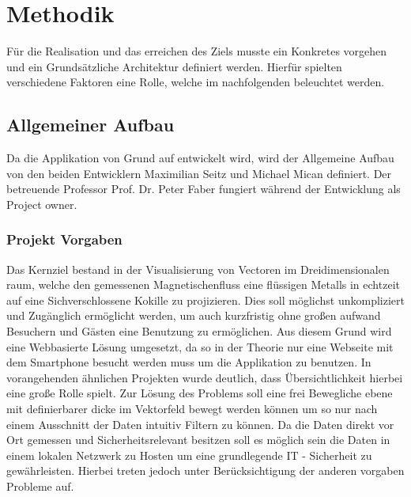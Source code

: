 \section{Methodik}
Für die Realisation und das erreichen des Ziels musste ein Konkretes vorgehen und ein Grundsätzliche Architektur definiert werden. Hierfür spielten verschiedene Faktoren eine Rolle, welche im nachfolgenden beleuchtet werden.

\subsection{Allgemeiner Aufbau}
Da die Applikation von Grund auf entwickelt wird, wird der Allgemeine Aufbau von den beiden Entwicklern Maximilian Seitz und Michael Mican definiert. Der betreuende Professor Prof. Dr. Peter Faber fungiert während der Entwicklung als Project owner.

\subsubsection{Projekt Vorgaben}
Das Kernziel bestand in der Visualisierung von Vectoren im Dreidimensionalen raum, welche den gemessenen Magnetischenfluss eine flüssigen Metalls in echtzeit auf eine Sichverschlossene Kokille zu projizieren. Dies soll möglichst unkompliziert und Zugänglich ermöglicht werden, um auch kurzfristig ohne großen aufwand Besuchern und Gästen eine Benutzung zu ermöglichen. Aus diesem Grund wird eine Webbasierte Lösung umgesetzt, da so in der Theorie nur eine Webseite mit dem Smartphone besucht werden muss um die Applikation zu benutzen. In vorangehenden ähnlichen Projekten wurde deutlich, dass Übersichtlichkeit hierbei eine große Rolle spielt. Zur Lösung des Problems soll eine frei Bewegliche ebene mit definierbarer dicke im Vektorfeld bewegt werden können um so nur nach einem Ausschnitt der Daten intuitiv Filtern zu können. Da die Daten direkt vor Ort gemessen und Sicherheitsrelevant besitzen soll es möglich sein die Daten in einem lokalen Netzwerk zu Hosten um eine grundlegende IT - Sicherheit zu gewährleisten. Hierbei treten jedoch unter Berücksichtigung der anderen vorgaben Probleme auf.


%	
%	


